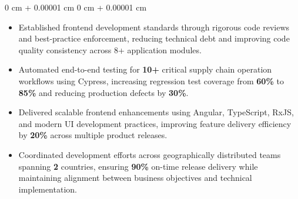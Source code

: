 \documentclass[10pt, letterpaper]{article}
\newenvironment{highlights}{
    \begin{itemize}[
        topsep=0.10 cm,
        parsep=0.10 cm,
        partopsep=0pt,
        itemsep=0pt,
        leftmargin=0 cm + 10pt
    ]
}{
    \end{itemize}
} %
\newenvironment{onecolentry}{
    \begin{adjustwidth}{
        0 cm + 0.00001 cm
    }{
        0 cm + 0.00001 cm
    }
}{
    \end{adjustwidth}
} %
\begin{document}
\begin{onecolentry}
\begin{highlights}
                \item Established frontend development standards through rigorous code reviews and best-practice enforcement, reducing technical debt and improving code quality consistency across 8+ application modules.

                \item Automated end-to-end testing for \textbf{10+} critical supply chain operation workflows using Cypress, increasing regression test coverage from \textbf{60\%} to \textbf{85\%} and reducing production defects by \textbf{30\%}.

                \item Delivered scalable frontend enhancements using Angular, TypeScript, RxJS, and modern UI development practices, improving feature delivery efficiency by \textbf{20\%} across multiple product releases.

                \item Coordinated development efforts across geographically distributed teams spanning \textbf{2} countries, ensuring \textbf{90\%} on-time release delivery while maintaining alignment between business objectives and technical implementation.
            \end{highlights}
        \end{onecolentry}

        \vspace{0.2 cm}
\end{document}

